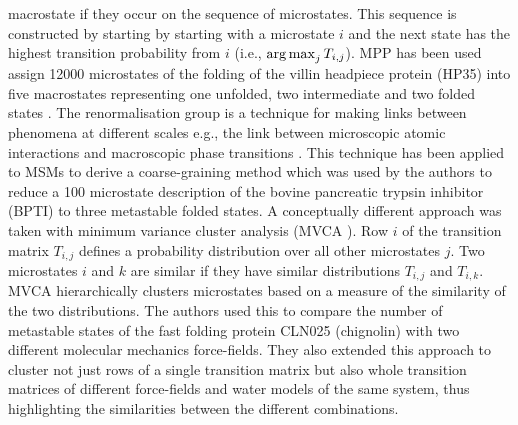 macrostate if they occur on the sequence of microstates. This sequence is constructed by starting by starting with a microstate $i$ and the next state has the highest transition probability from $i$ (i.e., $\operatorname*{arg\,max}_{j} T_{i,j}$). MPP has been used assign 12000 microstates of the folding of the villin headpiece protein (HP35) into five macrostates representing one unfolded, two intermediate and two folded states \cite{jainHierarchicalFoldingFree2014}.  The renormalisation group is a technique for making links between phenomena at different scales e.g., the link between microscopic atomic interactions and macroscopic phase transitions \cite{wilsonRenormalizationGroupCritical1983}. This technique has been applied to MSMs  \cite{orioliDimensionalReductionMarkov2016c} to derive a coarse-graining method which was used by the authors to reduce a 100 microstate description of the bovine  pancreatic  trypsin  inhibitor (BPTI) to three metastable folded states.  A conceptually different approach was taken with minimum variance cluster analysis (MVCA \cite{husicMinimumVarianceClustering2018}). Row $i$ of the transition matrix $T_{i,j}$ defines a probability distribution over all other microstates $j$. Two microstates $i$ and $k$ are similar if they have similar distributions $T_{i,j}$ and $T_{i,k}$. MVCA hierarchically clusters microstates based on a measure of the similarity of the two distributions. The authors used this to compare the number of metastable states of the fast folding protein CLN025 (chignolin) with two different molecular mechanics force-fields. They also extended this approach to cluster not just rows of a single transition matrix but also whole transition matrices of different force-fields and water models of the same system, thus highlighting the similarities between the different combinations.  

